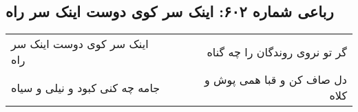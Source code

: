 \begin{center}
\section*{رباعی شماره ۶۰۲: اینک سر کوی دوست اینک سر راه}
\label{sec:sh602}
\begin{longtable}{l p{0.5cm} r}
اینک سر کوی دوست اینک سر راه
&&
گر تو نروی روندگان را چه گناه
\\
جامه چه کنی کبود و نیلی و سیاه
&&
دل صاف کن و قبا همی پوش و کلاه
\\
\end{longtable}
\end{center}
